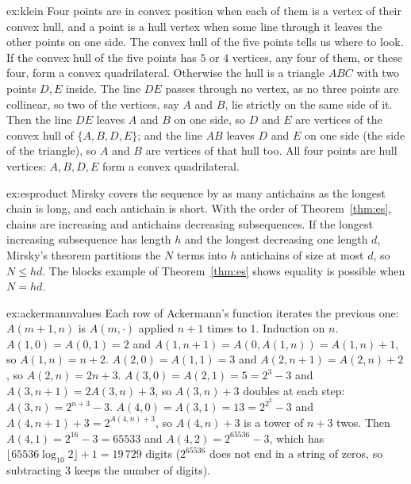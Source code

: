 \begin{solution}{ex:klein}
\idea Four points are in convex position when each of them is a vertex of their convex hull, and a point is a hull vertex
when some line through it leaves the other points on one side. The convex hull of the five points tells us where to look.
\writeup If the convex hull of the five points has $5$ or $4$ vertices, any four of them, or these four, form a convex
quadrilateral. Otherwise the hull is a triangle $ABC$ with two points $D,E$ inside. The line $DE$ passes through no vertex, as no three
points are collinear, so two of the vertices, say $A$ and $B$, lie strictly on the same side of it. Then the line $DE$ leaves $A$ and $B$
on one side, so $D$ and $E$ are vertices of the convex hull of $\{A,B,D,E\}$; and the line $AB$ leaves $D$ and $E$ on one side (the side of
the triangle), so $A$ and $B$ are vertices of that hull too. All four points are hull vertices: $A,B,D,E$ form a convex
quadrilateral.
\end{solution}

\begin{solution}{ex:esproduct}
\idea Mirsky covers the sequence by as many antichains as the longest chain is long, and each antichain is short.
\writeup With the order of Theorem~\ref{thm:es}, chains are increasing and antichains decreasing subsequences. If the longest
increasing subsequence has length $h$ and the longest decreasing one length $d$, Mirsky's theorem partitions the $N$ terms into $h$
antichains of size at most $d$, so $N\le hd$. The blocks example of Theorem~\ref{thm:es} shows equality is possible when $N=hd$.
\end{solution}

\begin{solution}{ex:ackermannvalues}
\idea Each row of Ackermann's function iterates the previous one: $A(m+1,n)$ is $A(m,\cdot)$ applied $n+1$ times to $1$.
\writeup Induction on $n$. $A(1,0)=A(0,1)=2$ and $A(1,n+1)=A(0,A(1,n))=A(1,n)+1$, so $A(1,n)=n+2$. $A(2,0)=A(1,1)=3$ and
$A(2,n+1)=A(2,n)+2$, so $A(2,n)=2n+3$. $A(3,0)=A(2,1)=5=2^3-3$ and $A(3,n+1)=2A(3,n)+3$, so $A(3,n)+3$ doubles at each step:
$A(3,n)=2^{n+3}-3$. $A(4,0)=A(3,1)=13=2^{2^2}-3$ and $A(4,n+1)+3=2^{A(4,n)+3}$, so $A(4,n)+3$ is a tower of $n+3$ twos. Then
$A(4,1)=2^{16}-3=65533$ and $A(4,2)=2^{65536}-3$, which has $\lfloor65536\log_{10}2\rfloor+1=19\,729$ digits ($2^{65536}$ does not end in a string of
zeros, so subtracting $3$ keeps the number of digits).
\end{solution}

